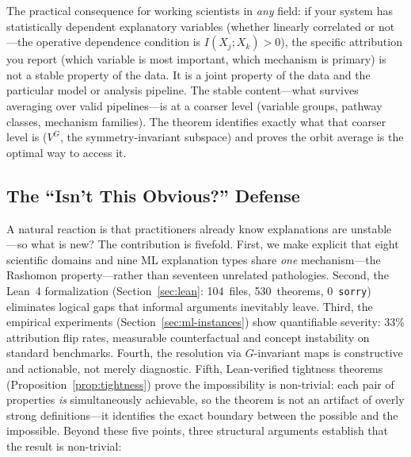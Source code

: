 \documentclass[11pt,a4paper]{article}
\begin{document}
The practical consequence for working scientists in \emph{any} field: if your system has statistically dependent explanatory variables (whether linearly correlated or not---the operative dependence condition is $I(X_j; X_k) > 0$), the specific attribution you report (which variable is most important, which mechanism is primary) is not a stable property of the data.  It is a joint property of the data and the particular model or analysis pipeline.  The stable content---what survives averaging over valid pipelines---is at a coarser level (variable groups, pathway classes, mechanism families).  The theorem identifies exactly what that coarser level is ($V^G$, the symmetry-invariant subspace) and proves the orbit average is the optimal way to access it.

\subsection[The Isn't This Obvious Defense]{The ``Isn't This Obvious?'' Defense}
\label{sec:obvious}

A natural reaction is that practitioners already know explanations are unstable
---so what is new?  The contribution is fivefold.  First, we make explicit that
eight scientific domains and nine ML explanation types share \emph{one}
mechanism---the Rashomon property---rather than seventeen unrelated
pathologies.  Second, the Lean~4
formalization (Section~\ref{sec:lean}: 104~files, 530~theorems, 0~\texttt{sorry})
eliminates logical gaps that informal arguments inevitably leave.  Third, the
empirical experiments (Section~\ref{sec:ml-instances}) show quantifiable severity:
33\% attribution flip rates, measurable counterfactual and concept instability on
standard benchmarks.  Fourth, the resolution via $G$-invariant maps is
constructive and actionable, not merely diagnostic.  Fifth, Lean-verified
tightness theorems (Proposition~\ref{prop:tightness}) prove the impossibility
is non-trivial: each pair of properties \emph{is} simultaneously achievable,
so the theorem is not an artifact of overly strong definitions---it identifies
the exact boundary between the possible and the impossible.
Beyond these five points, three structural arguments establish that the
result is non-trivial:
\end{document}
